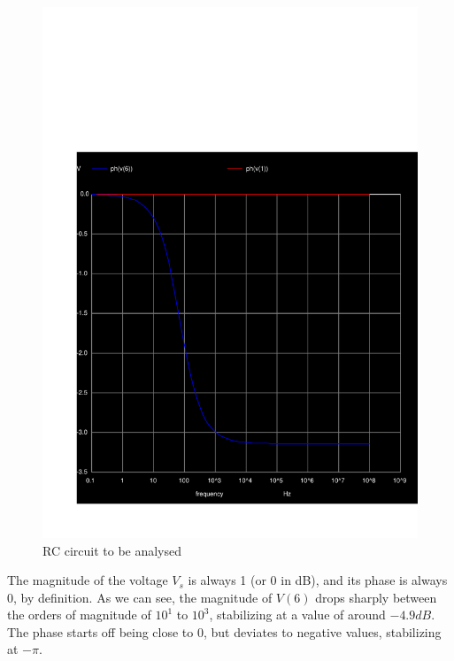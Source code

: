     \begin{figure}[H] \centering
        \includegraphics[width=1\linewidth]{../sim/phase5.pdf}
        \caption{RC circuit to be analysed}
        \label{fig:p5phase}
        \end{figure}

The magnitude of the voltage $V_s$ is always 1 (or 0 in dB), and its phase is always 0, by definition.
As we can see, the magnitude of $V(6)$ drops sharply between the orders of magnitude of $10^1$ to $10^3$,
stabilizing at a value of around $-4.9 dB$.
The phase starts off being close to 0, but deviates to negative values, stabilizing at $-\pi$.

